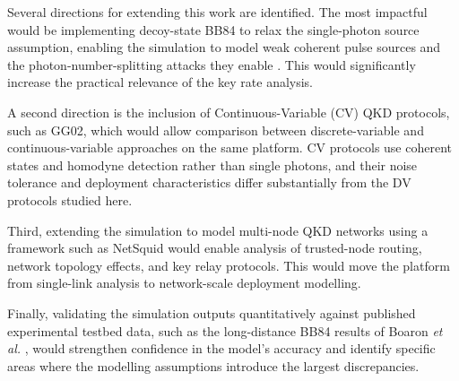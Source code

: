 Several directions for extending this work are identified. The most impactful would be implementing decoy-state BB84 to relax the single-photon source assumption, enabling the simulation to model weak coherent pulse sources and the photon-number-splitting attacks they enable \cite{Lo2005Decoy}. This would significantly increase the practical relevance of the key rate analysis.

A second direction is the inclusion of Continuous-Variable (CV) QKD protocols, such as GG02, which would allow comparison between discrete-variable and continuous-variable approaches on the same platform. CV protocols use coherent states and homodyne detection rather than single photons, and their noise tolerance and deployment characteristics differ substantially from the DV protocols studied here.

Third, extending the simulation to model multi-node QKD networks using a framework such as NetSquid \cite{NetSquid2021} would enable analysis of trusted-node routing, network topology effects, and key relay protocols. This would move the platform from single-link analysis to network-scale deployment modelling.

Finally, validating the simulation outputs quantitatively against published experimental testbed data, such as the long-distance BB84 results of Boaron \textit{et al.} \cite{Boaron2018}, would strengthen confidence in the model's accuracy and identify specific areas where the modelling assumptions introduce the largest discrepancies.


                